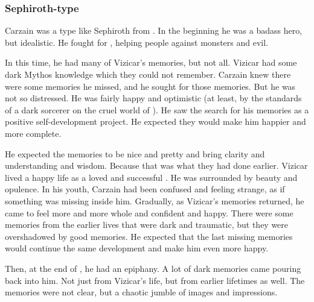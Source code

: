 \subsubsection{Sephiroth-type}
Carzain was a type like Sephiroth from \cite{VideoGame:FinalFantasyVII}. 
In the beginning he was a badass hero, but idealistic.
He fought for , helping people against monsters and evil. 

In this time, he had many of Vizicar's memories, but not all. 
Vizicar had some dark Mythos knowledge which they could not remember. 
Carzain knew there were some memories he missed, and he sought for those memories. 
But he was not so distressed. 
He was fairly happy and optimistic (at least, by the standards of a dark sorcerer on the cruel world of \Miith). 
He saw the search for his memories as a positive self-development project. 
He expected they would make him happier and more complete. 

He expected the memories to be nice and pretty and bring clarity and understanding and wisdom. 
Because that was what they had done earlier. 
Vizicar lived a happy life as a loved and successful \caliph. 
He was surrounded by beauty and opulence. 
In his youth, Carzain had been confused and feeling strange, as if something was missing inside him.
Gradually, as Vizicar's memories returned, he came to feel more and more whole and confident and happy. 
There were some memories from the earlier lives that were dark and traumatic, but they were overshadowed by good memories. 
He expected that the last missing memories would continue the same development and make him even more happy. 

Then, at the end of \TwilightAngelRememberEmph, he had an epiphany. 
A lot of dark memories came pouring back into him. 
Not just from Vizicar's life, but from earlier lifetimes as well. 
The memories were not clear, but a chaotic jumble of images and impressions. 

